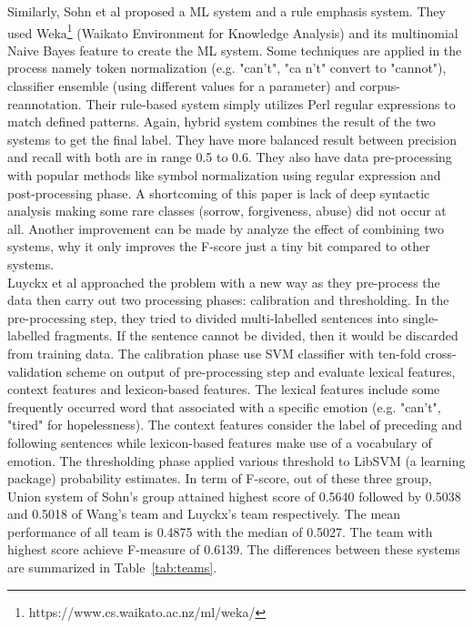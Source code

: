 Similarly, Sohn et al \cite{Sohn2012} proposed a ML system and a rule emphasis system. They used Weka\footnote{https://www.cs.waikato.ac.nz/ml/weka/} (Waikato Environment for Knowledge Analysis) and its multinomial Naive Bayes feature to create the ML system. Some techniques are applied in the process namely token normalization (e.g. "can’t", "ca n’t" convert to "cannot"), classifier ensemble (using different values for a parameter) and corpus-reannotation. Their rule-based system simply utilizes Perl regular expressions to match defined patterns. Again, hybrid system combines the result of the two systems to get the final label. They have more balanced result between precision and recall with both are in range 0.5 to 0.6. They also have data pre-processing with popular methods like symbol normalization using regular expression and post-processing phase. A shortcoming of this paper is lack of deep syntactic analysis making some rare classes (sorrow, forgiveness, abuse) did not occur at all. Another improvement can be made by analyze the effect of combining two systems, why it only improves the F-score just a tiny bit compared to other systems.\\
Luyckx et al \cite{Luyckx2012} approached the problem with a new way as they pre-process the data then carry out two processing phases: calibration and thresholding. In the pre-processing step, they tried to divided multi-labelled sentences into single-labelled fragments. If the sentence cannot be divided, then it would be discarded from training data. The calibration phase use SVM classifier with ten-fold cross-validation scheme on output of pre-processing step and evaluate lexical features, context features and lexicon-based features. The lexical features include some frequently occurred word that associated with a specific emotion (e.g. "can’t", "tired" for hopelessness). The context features consider the label of preceding and following sentences while lexicon-based features make use of a vocabulary of emotion. The thresholding phase applied various threshold to LibSVM (a learning package) probability estimates. In term of F-score, out of these three group, Union system of Sohn's group attained highest score of 0.5640 followed by 0.5038 and 0.5018 of Wang's team and Luyckx's team respectively. The mean performance of all team is 0.4875 with the median of 0.5027. The team with highest score achieve F-measure of 0.6139. The differences between these systems are summarized in Table~\ref{tab:teams}.\\


